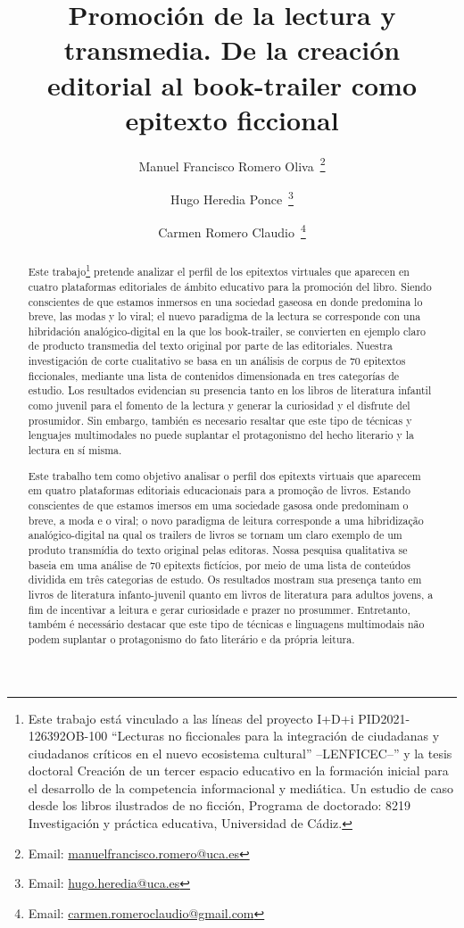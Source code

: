 \documentclass[spanish]{textolivre}
\title{Promoción de la lectura y transmedia. De la creación editorial al book-trailer como epitexto ficcional}
\author[1]{Manuel Francisco Romero Oliva~\orcid{0000-0002-6854-0682}\thanks{Email: \href{mailto:manuelfrancisco.romero@uca.es}{manuelfrancisco.romero@uca.es}}}
\author[1]{Hugo Heredia Ponce~\orcid{0000-0003-3657-1369}\thanks{Email: \href{mailto:hugo.heredia@uca.es}{hugo.heredia@uca.es}}}
\author[1]{Carmen Romero Claudio~\orcid{0000-0002-2813-9579}\thanks{Email: \href{mailto:carmen.romeroclaudio@gmail.com}{carmen.romeroclaudio@gmail.com}}}
\affil[1]{Universidad de Cádiz, Facultad de Ciencias de la Educación, Departamento de Didáctica de la Lengua y la Literatura, Cádiz, España.}
\begin{document}
\maketitle

\begin{polyabstract}
\begin{abstract}
Este trabajo\footnote{Este trabajo está vinculado a las líneas del proyecto I+D+i PID2021-126392OB-100 “Lecturas no ficcionales para la integración de ciudadanas y ciudadanos críticos en el nuevo ecosistema cultural” –LENFICEC–” y la tesis doctoral Creación de un tercer espacio educativo en la formación inicial para el desarrollo de la competencia informacional y mediática. Un estudio de caso desde los libros ilustrados de no ficción, Programa de doctorado: 8219 Investigación y práctica educativa, Universidad de Cádiz.} pretende analizar el perfil de los epitextos virtuales que aparecen en cuatro plataformas editoriales de ámbito educativo para la promoción del libro. Siendo conscientes de que estamos inmersos en una sociedad gaseosa \cite{scolari2021}%
 en donde predomina lo breve, las modas y lo viral; el nuevo paradigma de la lectura se corresponde con una hibridación analógico-digital en la que los book-trailer, se convierten en ejemplo claro de producto transmedia del texto original por parte de las editoriales. Nuestra investigación de corte cualitativo se basa en un análisis de corpus de 70 epitextos ficcionales, mediante una lista de contenidos dimensionada en tres categorías de estudio. Los resultados evidencian su presencia tanto en los libros de literatura infantil como juvenil para el fomento de la lectura y generar la curiosidad y el disfrute del prosumidor. Sin embargo, también es necesario resaltar que este tipo de técnicas y lenguajes multimodales no puede suplantar el protagonismo del hecho literario y la lectura en sí misma.

\end{abstract}

\begin{portuguese}
\begin{abstract}
Este trabalho tem como objetivo analisar o perfil dos epitexts virtuais que aparecem em quatro plataformas editoriais educacionais para a promoção de livros. Estando conscientes de que estamos imersos em uma sociedade gasosa \cite{scolari2021}%
onde predominam o breve, a moda e o viral; o novo paradigma de leitura corresponde a uma hibridização analógico-digital na qual os trailers de livros se tornam um claro exemplo de um produto transmídia do texto original pelas editoras. Nossa pesquisa qualitativa se baseia em uma análise de 70 epitexts fictícios, por meio de uma lista de conteúdos dividida em três categorias de estudo. Os resultados mostram sua presença tanto em livros de literatura infanto-juvenil quanto em livros de literatura para adultos jovens, a fim de incentivar a leitura e gerar curiosidade e prazer no prosummer. Entretanto, também é necessário destacar que este tipo de técnicas e linguagens multimodais não podem suplantar o protagonismo do fato literário e da própria leitura.


\end{abstract}
\end{portuguese}
\end{polyabstract}
\end{document}
